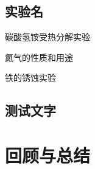 \documentclass[color=orange,openany]{textbook-cn}
\begin{document}
\begin{Project}
\section{实验名}
\begin{Point}
\lipsum[2]
\end{Point}

\begin{Case}
\item 碳酸氢铵受热分解实验
\item 氮气的性质和用途
\item 铁的锈蚀实验
\end{Case}

\subsection{测试文字}
\lipsum
\begin{Definition}[定理名称]
\lipsum[1]
\end{Definition}

\begin{Lemma}[引理名称]
\lipsum[1]
\end{Lemma}
\end{Project}



\section{回顾与总结}
\begin{Point*}
\lipsum[1]
\end{Point*}

\begin{Case*}
\item \lipsum[1][1]
\item \lipsum[1][1]
\item \lipsum[1][1]
\item \lipsum[1][1]
\item \lipsum[1][1]
\item \lipsum[1][1]
\item \lipsum[1][1]
\end{Case*}
\end{document}
